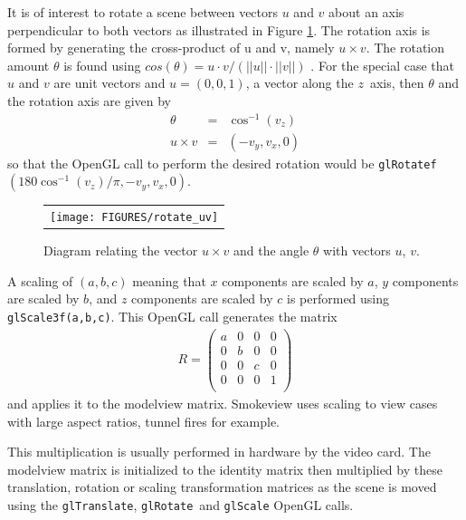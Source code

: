 \documentclass[11pt,twoside]{book}
\begin{document}
It is of interest to rotate a scene between vectors $u$ and $v$ about an axis perpendicular to both vectors
as illustrated in Figure \ref{figrotateuv}.
The rotation axis is formed by generating the cross-product of u and v, namely $u\times v$.  The
rotation amount $\theta$ is found using $cos(\theta)=u\cdot v/(||u||\cdot ||v||)$ .  For the special case that $u$ and $v$ are unit vectors
and $u=(0,0,1)$, a vector along the $z$~axis, then $\theta$ and the rotation axis are given by
\begin{eqnarray}
\theta&=&\cos^{-1}(v_z)\\
u\times v&=&(-v_y,v_x,0)
\end{eqnarray}
so that the OpenGL call to perform the desired rotation would be {\tt glRotatef}$(180\cos^{-1}(v_z)/\pi,-v_y,v_x,0)$.

\begin{figure}[\figoptions]
\begin{center}
\begin{tabular}{c}
\texttt{[image: FIGURES/rotate\_uv]}
\end{tabular}
\end{center}
\caption{Diagram relating the vector $u\times v$ and the angle $\theta$
with vectors $u$, $v$. }
\label{figrotateuv}
\end{figure}

A scaling of $(a,b,c)$ meaning that
$x$ components are scaled by $a$,
$y$ components are scaled by $b$,
and $z$ components are scaled by $c$
is performed using {\tt glScale3f(a,b,c)}.
This OpenGL call generates the matrix
\begin{eqnarray}
R=\left(%
\begin{array}{cccc}
  a & 0 & 0 & 0 \\
  0 & b & 0 & 0 \\
  0 & 0 & c & 0 \\
  0 & 0 & 0 & 1 \\
\end{array}%
\right)
\end{eqnarray}
and applies it to the modelview matrix.
Smokeview uses scaling to
view cases with large aspect ratios, tunnel fires for example.

This multiplication is usually performed in
hardware by the video card.  The modelview matrix is initialized
to the identity matrix then multiplied by these
translation, rotation or scaling transformation matrices as the scene is moved using
the {\tt glTranslate}, {\tt glRotate}\ and {\tt glScale} OpenGL
calls.
\end{document}
